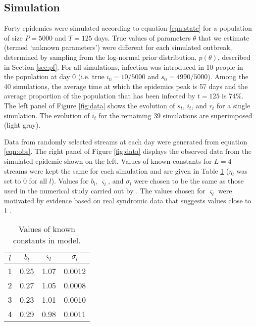 \documentclass{elsarticle}
\begin{document}
\subsection{Simulation}

Forty epidemics were simulated according to equation \eqref{eqn:state} for a population of size $P = 5000$ and $T = 125$ days. True values of parameters $\theta$ that we estimate (termed `unknown parameters') were different for each simulated outbreak, determined by sampling from the log-normal prior distribution, $p(\theta)$, described in Section \ref{sec:pf}. For all simulations, infection was introduced in 10 people in the population at day 0 (i.e. true $i_0 = 10/5000$ and $s_0 = 4990/5000$). Among the 40 simulations, the average time at which the epidemics peak is 57 days and the average proportion of the population that has been infected by $t = 125$ is 74\%. The left panel of Figure \ref{fig:data} shows the evolution of $s_t$, $i_t$, and $r_t$ for a single simulation. The evolution of $i_t$ for the remaining 39 simulations are superimposed (light gray).

Data from randomly selected streams at each day were generated from equation \eqref{eqn:obs}. The right panel of Figure \ref{fig:data} displays the observed data from the simulated epidemic shown on the left. Values of known constants for $L = 4$ streams were kept the same for each simulation and are given in Table \ref{tab:constants} ($\eta_l$ was set to 0 for all $l$). Values for $b_l$, $\varsigma_l$, and $\sigma_l$ were chosen to be the same as those used in the numerical study carried out by \citet{skvortsov2012monitoring}. The values chosen for $\varsigma_l$ were motivated by evidence based on real syndromic data that suggests values close to 1 \citep{chew2010twitter}.

\begin{table}
\begin{center}
\begin{tabular}{|cccc|}
\hline
$l$ & $b_l$ & $\varsigma_l$ & $\sigma_l$ \\
\hline
1 & 0.25 & 1.07 & 0.0012 \\
2 & 0.27 & 1.05 & 0.0008 \\
3 & 0.23 & 1.01 & 0.0010 \\
4 & 0.29 & 0.98 & 0.0011 \\
\hline
\end{tabular}
\caption{Values of known constants in model.}
\label{tab:constants}
\end{center}
\end{table}
\end{document}
